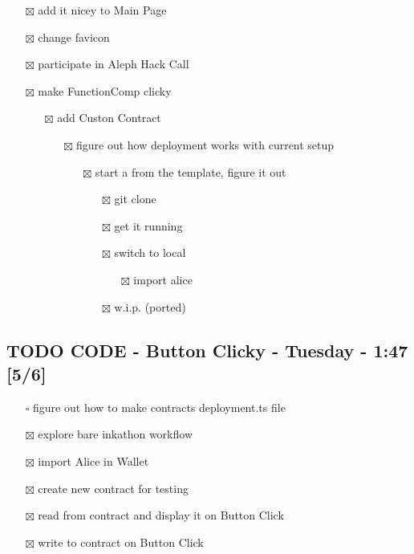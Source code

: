 \documentclass[11pt]{article}
\begin{document}
\begin{itemize}
\begin{itemize}
\begin{itemize}
\item[{$\boxtimes$}] add it nicey to Main Page
\item[{$\boxtimes$}] change favicon
\item[{$\boxtimes$}] participate in Aleph Hack Call
\item[{$\boxtimes$}] make FunctionComp clicky
\begin{itemize}
\item[{$\boxtimes$}] add Custon Contract
\begin{itemize}
\item[{$\boxtimes$}] figure out how deployment works with current setup
\begin{itemize}
\item[{$\boxtimes$}] start a from the template, figure it out
\begin{itemize}
\item[{$\boxtimes$}] git clone
\item[{$\boxtimes$}] get it running
\item[{$\boxtimes$}] switch to local
\begin{itemize}
\item[{$\boxtimes$}] import alice
\end{itemize}
\item[{$\boxtimes$}] w.i.p. (ported)
\end{itemize}
\end{itemize}
\end{itemize}
\end{itemize}
\end{itemize}
\end{itemize}
\end{itemize}
\subsection{{\bfseries\sffamily TODO} CODE - Button Clicky - Tuesday - 1:47 [5/6]}
\label{sec:orgd107dac}
\begin{itemize}
\item[{$\square$}] figure out how to make contracts deployment.ts file
\item[{$\boxtimes$}] explore bare inkathon workflow
\item[{$\boxtimes$}] import Alice in Wallet
\item[{$\boxtimes$}] create new contract for testing
\item[{$\boxtimes$}] read from contract and display it on Button Click
\item[{$\boxtimes$}] write to contract on Button Click
\end{itemize}
\end{document}
